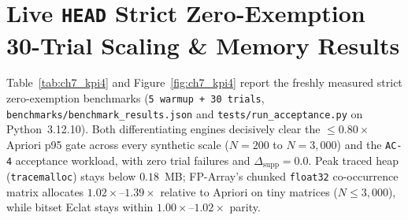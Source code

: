 \section{Live \texttt{HEAD} Strict Zero-Exemption 30-Trial Scaling \& Memory Results}
Table~\ref{tab:ch7_kpi4} and Figure~\ref{fig:ch7_kpi4} report the freshly measured strict zero-exemption benchmarks (\texttt{5 warmup + 30 trials}, \texttt{benchmarks/benchmark\_\protect\allowbreak{}results.json} and \texttt{tests/run\_\protect\allowbreak{}acceptance.py} on Python~3.12.10). Both differentiating engines decisively clear the $\le 0.80\times$ Apriori p95 gate across every synthetic scale ($N=200$ to $N=3{,}000$) and the \texttt{AC-4} acceptance workload, with zero trial failures and $\Delta_{\mathrm{supp}}=0.0$. Peak traced heap (\texttt{tracemalloc}) stays below $0.18$~MB; FP-Array's chunked \texttt{float32} co-occurrence matrix allocates $1.02\times$--$1.39\times$ relative to Apriori on tiny matrices ($N \le 3{,}000$), while bitset Eclat stays within $1.00\times$--$1.02\times$ parity.

